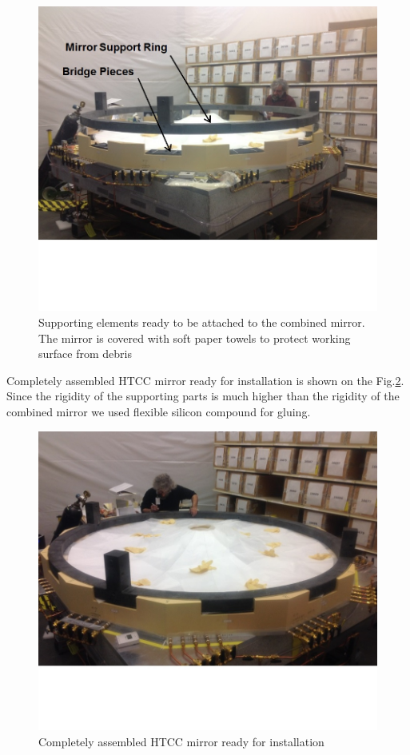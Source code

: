 \begin{figure}[h]
    \centering
    \includegraphics[width=1.0\linewidth,trim={0 5cm 0 0},clip]{images/Support_Ring.jpg}
    \caption{Supporting elements ready to be attached to the combined mirror. The mirror is covered with soft paper towels to protect working surface from debris}
    \label{fig:Support_Ring}
\end{figure}

  Completely assembled HTCC mirror ready for installation is shown on the Fig.\ref{fig:Ring_to_Mirror}. Since the rigidity of the supporting parts is much higher than the rigidity of the combined mirror we used flexible silicon compound for gluing.
  
\begin{figure}[h]
    \centering
    \includegraphics[width=1.0\linewidth,trim={0 5cm 0 0},clip]{images/Ring_to_Mirror.jpg}
    \caption{Completely assembled HTCC mirror ready for installation}
    \label{fig:Ring_to_Mirror}
\end{figure}
 

